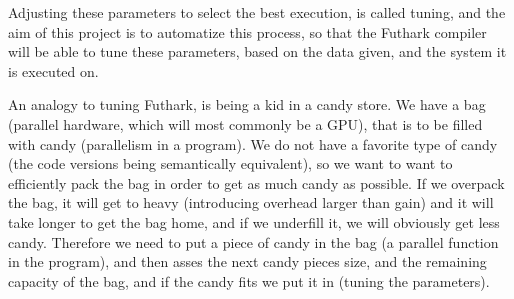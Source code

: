 Adjusting these parameters to select the best execution, is called tuning, and the aim of this project is to automatize this process, so that the Futhark compiler will be able to tune these parameters, based on the data given, and the system it is executed on.

An analogy to tuning Futhark, is being a kid in a candy store. We have a bag (parallel hardware, which will most commonly be a GPU), that is to be filled with candy (parallelism in a program). We do not have a favorite type of candy (the code versions being semantically equivalent), so we want to want to efficiently pack the bag in order to get as much candy as possible. If we overpack the bag, it will get to heavy (introducing overhead larger than gain) and it will take longer to get the bag home, and if we underfill it, we will obviously get less candy. Therefore we need to put a piece of candy in the bag (a parallel function in the program), and then asses the next candy pieces size, and the remaining capacity of the bag, and if the candy fits we put it in (tuning the parameters). 
